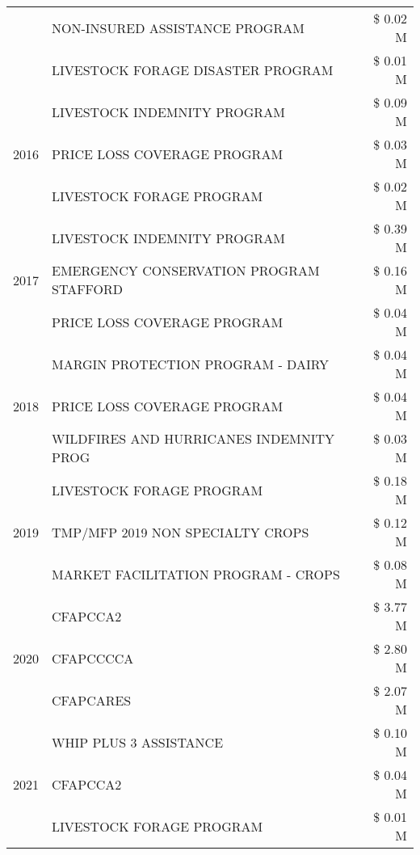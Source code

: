 \begin{tabular}{llr}
 & NON-INSURED ASSISTANCE PROGRAM & \$ 0.02 M \\
 & LIVESTOCK FORAGE DISASTER PROGRAM & \$ 0.01 M \\
\cline{1-3}
\multirow[t]{3}{*}{2016} & LIVESTOCK INDEMNITY PROGRAM & \$ 0.09 M \\
 & PRICE LOSS COVERAGE PROGRAM & \$ 0.03 M \\
 & LIVESTOCK FORAGE PROGRAM & \$ 0.02 M \\
\cline{1-3}
\multirow[t]{3}{*}{2017} & LIVESTOCK INDEMNITY PROGRAM & \$ 0.39 M \\
 & EMERGENCY CONSERVATION PROGRAM STAFFORD & \$ 0.16 M \\
 & PRICE LOSS COVERAGE PROGRAM & \$ 0.04 M \\
\cline{1-3}
\multirow[t]{3}{*}{2018} & MARGIN PROTECTION PROGRAM - DAIRY & \$ 0.04 M \\
 & PRICE LOSS COVERAGE PROGRAM & \$ 0.04 M \\
 & WILDFIRES AND HURRICANES INDEMNITY PROG & \$ 0.03 M \\
\cline{1-3}
\multirow[t]{3}{*}{2019} & LIVESTOCK FORAGE PROGRAM & \$ 0.18 M \\
 & TMP/MFP 2019 NON SPECIALTY CROPS & \$ 0.12 M \\
 & MARKET FACILITATION PROGRAM - CROPS & \$ 0.08 M \\
\cline{1-3}
\multirow[t]{3}{*}{2020} & CFAPCCA2 & \$ 3.77 M \\
 & CFAPCCCCA & \$ 2.80 M \\
 & CFAPCARES & \$ 2.07 M \\
\cline{1-3}
\multirow[t]{3}{*}{2021} & WHIP PLUS 3 ASSISTANCE & \$ 0.10 M \\
 & CFAPCCA2 & \$ 0.04 M \\
 & LIVESTOCK FORAGE PROGRAM & \$ 0.01 M \\
\cline{1-3}
\bottomrule
\end{tabular}
